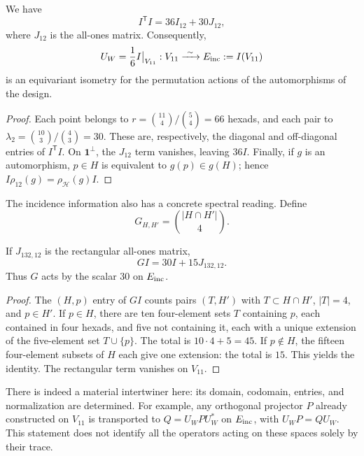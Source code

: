 \begin{proposition}
\label{exc:isometria}
We have
\[
 I^{\mathsf T}I=36I_{12}+30J_{12},
\]
where $J_{12}$ is the all-ones matrix. Consequently,
\[
 U_W=\frac16 I\big|_{V_{11}}:
 V_{11}\xrightarrow{\ \sim\ }E_{\rm inc}:=I(V_{11})
\]
is an equivariant isometry for the permutation actions of the
automorphisms of the design.
\end{proposition}

\begin{proof}
Each point belongs to
$r=\binom{11}{4}/\binom54=66$ hexads, and each pair to
$\lambda_2=\binom{10}{3}/\binom43=30$. These are, respectively, the
diagonal and off-diagonal entries of $I^{\mathsf T}I$. On
$\mathbf1^\perp$, the $J_{12}$ term vanishes, leaving $36I$.
Finally, if $g$ is an automorphism, $p\in H$ is equivalent to
$g(p)\in g(H)$; hence $I\rho_{12}(g)=\rho_{\mathcal H}(g)I$.
\end{proof}

The incidence information also has a concrete spectral
reading. Define
\[
 G_{H,H'}=\binom{|H\cap H'|}{4}.
\]

\begin{lemma}
\label{exc:espectro}
If $J_{132,12}$ is the rectangular all-ones matrix,
\[
 GI=30I+15J_{132,12}.
\]
Thus $G$ acts by the scalar $30$ on $E_{\rm inc}$.
\end{lemma}

\begin{proof}
The $(H,p)$ entry of $GI$ counts pairs $(T,H')$ with
$T\subset H\cap H'$, $|T|=4$, and $p\in H'$. If $p\in H$, there are ten
four-element sets $T$ containing $p$, each contained in four hexads,
and five not containing it, each with a unique extension of the
five-element set $T\cup\{p\}$. The total is $10\cdot4+5=45$.
If $p\notin H$, the fifteen four-element subsets of $H$ each give one extension:
the total is $15$. This yields the identity. The rectangular term
vanishes on $V_{11}$.
\end{proof}

There is indeed a material intertwiner here: its domain, codomain,
entries, and normalization are determined. For example, any
orthogonal projector $P$ already constructed on $V_{11}$ is transported to
$Q=U_WPU_W^*$ on $E_{\rm inc}$, with
$U_WP=QU_W$. This statement does not identify all the
operators acting on these spaces solely by their trace.



